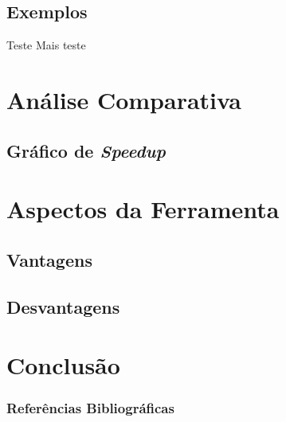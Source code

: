 \documentclass{beamer}
\begin{document}
\subsection{Exemplos}
\begin{frame}
    \begin{block}{Teste}
        Mais teste
    \end{block}
\end{frame}


\section{Análise Comparativa}
\subsection{Gráfico de \protect\textit{Speedup}}


\section{Aspectos da Ferramenta}
\subsection{Vantagens}
\subsection{Desvantagens}


\section{Conclusão}
\begin{frame}%
    \frametitle{Referências Bibliográficas}
    \tiny{}
    
\end{frame}
\end{document}
